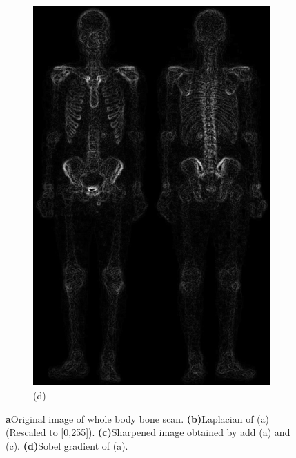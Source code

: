 \begin{figure}[h!]
\begin{subfigure}[b]{0.4\linewidth}
    	\includegraphics[width=\linewidth]{myfigure/p2/2-d.png}
		\caption*{(d)}
		\label{fig:2d}
  	\end{subfigure}
  	\caption{\textbf{a}Original image of whole body bone scan. \textbf{(b)}Laplacian of (a)(Rescaled to [0,255]). \textbf{(c)}Sharpened image obtained by add (a) and (c). \textbf{(d)}Sobel gradient of (a).}
  	\label{fig:abcd}
\end{figure}
\clearpage
